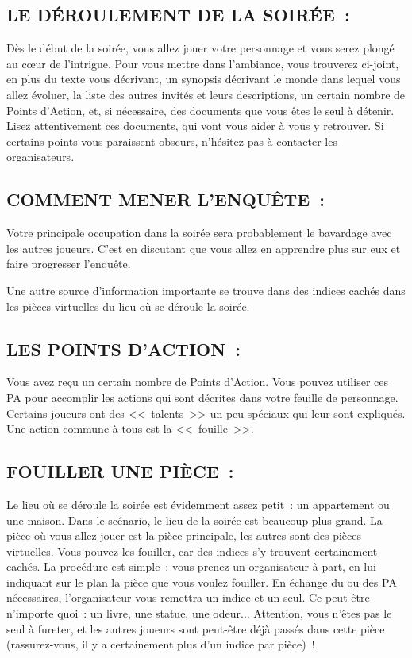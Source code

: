 \documentclass[14pt,twocolumn]{extarticle}
\begin{document}
\subsection{LE DÉROULEMENT DE LA SOIRÉE~:}

Dès le début de la soirée, vous allez jouer votre personnage et vous serez
plongé au c\oe{}ur de l’intrigue. Pour vous mettre dans l’ambiance, vous
trouverez ci-joint, en plus du texte vous décrivant, un synopsis décrivant le
monde dans lequel vous allez évoluer, la liste des autres invités et leurs
descriptions, un certain nombre de Points d’Action, et, si nécessaire, des
documents que vous êtes le seul à détenir. Lisez attentivement ces documents,
qui vont vous aider à vous y retrouver. Si certains points vous paraissent
obscurs, n’hésitez pas à contacter les organisateurs.

\subsection{COMMENT MENER L'ENQUÊTE~:}

Votre principale occupation dans la soirée sera probablement le bavardage avec
les autres joueurs. C’est en discutant que vous allez en apprendre plus sur eux
et faire progresser l’enquête.

Une autre source d’information importante se trouve dans des indices cachés
dans les pièces virtuelles du lieu où se déroule la soirée.

\subsection{LES POINTS D'ACTION~:}

Vous avez reçu un certain nombre de Points d’Action. Vous pouvez utiliser ces
PA pour accomplir les actions qui sont décrites dans votre feuille de
personnage. Certains joueurs ont des <<~talents~>> un peu spéciaux qui leur
sont expliqués. Une action commune à tous est la <<~fouille~>>.

\subsection{FOUILLER UNE PIÈCE~:}

Le lieu où se déroule la soirée est évidemment assez petit~: un appartement ou
une maison. Dans le scénario, le lieu de la soirée est beaucoup plus grand. La
pièce où vous allez jouer est la pièce principale, les autres sont des pièces
virtuelles. Vous pouvez les fouiller, car des indices s’y trouvent certainement
cachés. La procédure est simple~: vous prenez un organisateur à part, en lui
indiquant sur le plan la pièce que vous voulez fouiller. En échange du ou des
PA nécessaires, l’organisateur vous remettra un indice et un seul. Ce peut être
n’importe quoi~: un livre, une statue, une odeur... Attention, vous n’êtes pas
le seul à fureter, et les autres joueurs sont peut-être déjà passés dans cette
pièce (rassurez-vous, il y a certainement plus d’un indice par pièce)~!
\end{document}
